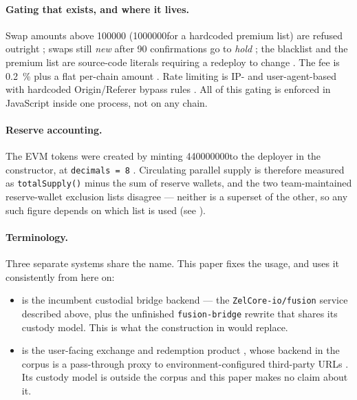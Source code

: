 \paragraph{Gating that exists, and where it lives.} Swap amounts above \num{100000}\flux
(\num{1000000}\flux for a hardcoded premium list) are refused outright
; swaps still \textit{new} after 90
confirmations go to \textit{hold} ; the blacklist and the
premium list are source-code literals requiring a redeploy to change
 . The fee is
\SI{0.2}{\percent} plus a flat per-chain amount .
Rate limiting is IP- and user-agent-based with hardcoded Origin/Referer bypass rules
. All of this gating is enforced in JavaScript
inside one process, not on any chain. \shipped

\paragraph{Reserve accounting.} The EVM tokens were created by minting \num{440000000}\flux to the
deployer in the constructor, at \texttt{decimals =\allowbreak{} 8}
. Circulating parallel supply is therefore measured as
\texttt{totalSupply()} minus the sum of reserve wallets, and the two team-maintained
reserve-wallet exclusion lists disagree --- neither is a superset of the other, so any such figure
depends on which list is used (see ). \shipped

\paragraph{Terminology.} Three separate systems share the name. This paper fixes the usage, and uses
it consistently from here on:

\begin{itemize}
\item \Fusion is the incumbent custodial bridge backend --- the \texttt{Zel\allowbreak{}Core-\allowbreak{}io/\allowbreak{}fusion} service
      described above, plus the unfinished \texttt{fusion-bridge} rewrite that shares its custody
      model. This is what the construction in  would replace.
\item \FusionX is the user-facing exchange and redemption product
      , whose backend in the corpus is a
      pass-through proxy to environment-configured third-party URLs
      . Its custody model is
      outside the corpus and this paper makes no claim about it.
\end{itemize}

